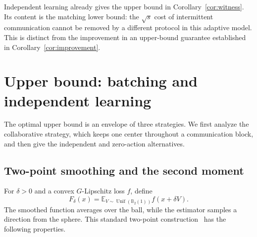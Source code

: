 \documentclass[11pt,a4paper]{article}
\numberwithin{equation}{section}
\theoremstyle{remark}
\newcommand{\E}{\mathbb E}
\newcommand{\B}{\mathbb B_2}
\DeclareMathOperator{\Unif}{Unif}
\begin{document}
Independent learning already gives the upper bound in
Corollary~\ref{cor:witness}. Its content is the matching lower bound:
the $\sqrt s$ cost of intermittent communication cannot be removed by
a different protocol in this adaptive model. This is distinct from
the improvement in an upper-bound guarantee established in
Corollary~\ref{cor:improvement}.

\section{Upper bound: batching and independent learning}
\label{sec:upper}

The optimal upper bound is an envelope of three strategies. We first analyze the collaborative strategy, which keeps one center throughout a communication block, and then give the independent and zero-action alternatives.

\subsection{Two-point smoothing and the second moment}

For $\delta>0$ and a convex $G$-Lipschitz loss $f$, define
\[
 F_\delta(x)=\E_{V\sim\Unif(\B(1))}f(x+\delta V).
\]
The smoothed function averages over the ball, while the estimator samples a direction from the sphere. This standard two-point construction~\cite{ADX10,Shamir17} has the following properties.
\end{document}
